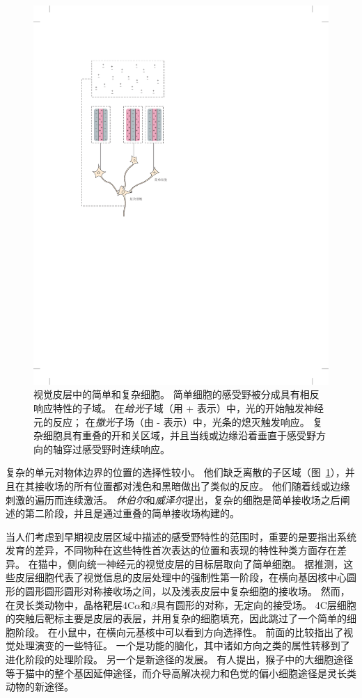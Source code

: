 \begin{figure}[htbp]
	\centering
	\includegraphics[width=0.6\linewidth]{chap23/fig_23_4}
	\caption{视觉皮层中的简单和复杂细胞。
		简单细胞的感受野被分成具有相反响应特性的子域。
		在\textit{给光}子域（用 + 表示）中，光的开始触发神经元的反应；
		在\textit{撤光}子场（由 - 表示）中，光条的熄灭触发响应。
		复杂细胞具有重叠的开和关区域，并且当线或边缘沿着垂直于感受野方向的轴穿过感受野时连续响应。}
	\label{fig:23_4}
\end{figure}


复杂的单元对物体边界的位置的选择性较小。
他们缺乏离散的子区域（图~\ref{fig:23_4}），并且在其接收场的所有位置都对浅色和黑暗做出了类似的反应。
他们随着线或边缘刺激的遍历而连续激活。
\textit{休伯尔}和\textit{威泽尔}提出，复杂的细胞是简单接收场之后阐述的第二阶段，并且是通过重叠的简单接收场构建的。


当人们考虑到早期视皮层区域中描述的感受野特性的范围时，重要的是要指出系统发育的差异，不同物种在这些特性首次表达的位置和表现的特性种类方面存在差异。
在猫中，侧向统一神经元的视觉皮层的目标层取向了简单细胞。
据推测，这些皮层细胞代表了视觉信息的皮层处理中的强制性第一阶段，在横向基因核中心圆形的圆形圆形圆形对称接收场之间，以及浅表皮层中复杂细胞的接收场。
然而，在灵长类动物中，晶格靶层4C$\alpha$和$\beta$具有圆形的对称，无定向的接受场。
4C层细胞的突触后靶标主要是皮层的表层，并用复杂的细胞填充，因此跳过了一个简单的细胞阶段。
在小鼠中，在横向元基核中可以看到方向选择性。
前面的比较指出了视觉处理演变的一些特征。
一个是功能的脑化，其中诸如方向之类的属性转移到了进化阶段的处理阶段。
另一个是新途径的发展。
有人提出，猴子中的大细胞途径等于猫中的整个基因延伸途径，而介导高解决视力和色觉的偏小细胞途径是灵长类动物的新途径。


